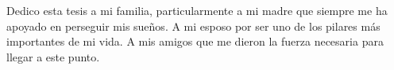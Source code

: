 \begin{dedication}
    Dedico esta tesis a mi familia, particularmente a mi madre que siempre me ha apoyado en perseguir mis sueños. A mi esposo por ser uno de los pilares más importantes de mi vida. A mis amigos que me dieron la fuerza necesaria para llegar a este punto.
\end{dedication}